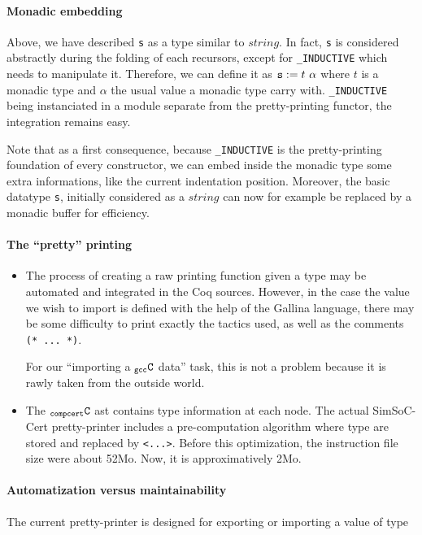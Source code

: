 \documentclass[a4paper, 11pt]{article}
\newcommand{\C}{$_{\tt compcert}{\tt C}$\xspace}
\newcommand{\gccC}{$_{\tt gcc}{\tt C}$\xspace}
\newcommand{\outworld}{the outside world\xspace}
\newcommand{\SScert}{SimSoC-Cert\xspace}
\begin{document}
\paragraph{Monadic embedding}
Above, we have described \verb|s| as a type similar to $string$. In fact, \verb|s| is considered abstractly during the folding of each recursors, except for \verb|_INDUCTIVE| which needs to manipulate it. Therefore, we can define it as $\verb|s| := t~\alpha$ where $t$ is a monadic type and $\alpha$ the usual value a monadic type carry with. \verb|_INDUCTIVE| being instanciated in a module separate from the pretty-printing functor, the integration remains easy.

Note that as a first consequence, because \verb|_INDUCTIVE| is the pretty-printing foundation of every constructor, we can embed inside the monadic type some extra informations, like the current indentation position. Moreover, the basic datatype \verb|s|, initially considered as a $string$ can now for example be replaced by a monadic buffer for efficiency.

\paragraph{The ``pretty'' printing}
\begin{itemize}
\item The process of creating a raw printing function given a type may be automated and integrated in the Coq sources. However, in the case the value we wish to import is defined with the help of the Gallina language, there may be some difficulty to print exactly the tactics used, as well as the comments \verb|(* ... *)|. 

For our ``importing a \gccC data'' task, this is not a problem because it is rawly taken from \outworld.


\item The \C ast contains type information at each node. The actual \SScert pretty-printer includes a pre-computation algorithm where type are stored and replaced by \verb|<...>|.
Before this optimization, the instruction file size were about 52Mo. Now, it is approximatively 2Mo.
\end{itemize}

\paragraph{Automatization versus maintainability}
The current pretty-printer is designed for exporting or importing a value of type 
\end{document}
